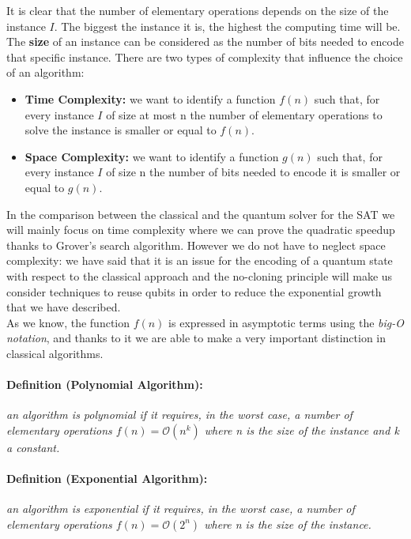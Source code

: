\documentclass[english]{article}
\begin{document}
			It is clear that the number of elementary operations depends on the size of the instance $I$. The biggest the instance it is, the highest the computing time will be. The \textbf{size} of an instance can be considered as the number of bits needed to encode that specific instance. There are two types of complexity that influence the choice of an algorithm:
			
			\begin{itemize}
				\item \textbf{Time Complexity:} we want to identify a function $f(n)$ such that, for every instance $I$ of size at most n the number of elementary operations to solve the instance is smaller or equal to $f(n)$.
				
				\item \textbf{Space Complexity:} we want to identify a function $g(n)$ such that, for every instance $I$ of size n the number of bits needed to encode it is smaller or equal to $g(n)$.
			\end{itemize}
			
			In the comparison between the classical and the quantum solver for the SAT we will mainly focus on time complexity where we can prove the quadratic speedup thanks to Grover's search algorithm. However we do not have to neglect space complexity: we have said that it is an issue for the encoding of a quantum state with respect to the classical approach and the no-cloning principle will make us consider techniques to reuse qubits in order to reduce the exponential growth that we have described. \\
			
			As we know, the function $f(n)$ is expressed in asymptotic terms using the \emph{big-O notation}, and thanks to it we are able to make a very important distinction in classical algorithms.
			
			\paragraph{Definition (Polynomial Algorithm):} \emph{an algorithm is polynomial if it requires, in the worst case, a number of elementary operations $f(n)=\mathcal{O}(n^k)$ where n is the size of the instance and k a constant.}
			
			\paragraph{Definition (Exponential Algorithm):} \emph{an algorithm is exponential if it requires, in the worst case, a number of elementary operations $f(n)=\mathcal{O}(2^n)$ where n is the size of the instance.} \\
			
\end{document}
